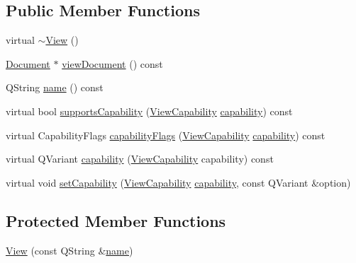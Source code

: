 \subsection*{Public Member Functions}
\begin{DoxyCompactItemize}
\item 
virtual \hyperlink{classOkular_1_1View_ad0dc854db9aabbea98a334dec89f785c}{$\sim$\+View} ()
\item 
\hyperlink{classOkular_1_1Document}{Document} $\ast$ \hyperlink{classOkular_1_1View_a0971e5296142cba87af2af289079efea}{view\+Document} () const 
\item 
Q\+String \hyperlink{classOkular_1_1View_aac1d4ae8bad44a4a845de118892cfa1e}{name} () const 
\item 
virtual bool \hyperlink{classOkular_1_1View_a65d4511363fe5a1fb836a26688bea50c}{supports\+Capability} (\hyperlink{classOkular_1_1View_ad95d365554715eb1eabb79350f51b294}{View\+Capability} \hyperlink{classOkular_1_1View_a32763d9566680b0ae37650a894245322}{capability}) const 
\item 
virtual Capability\+Flags \hyperlink{classOkular_1_1View_abad9d21eaeb248a4b6712aa5cd0ab6fc}{capability\+Flags} (\hyperlink{classOkular_1_1View_ad95d365554715eb1eabb79350f51b294}{View\+Capability} \hyperlink{classOkular_1_1View_a32763d9566680b0ae37650a894245322}{capability}) const 
\item 
virtual Q\+Variant \hyperlink{classOkular_1_1View_a32763d9566680b0ae37650a894245322}{capability} (\hyperlink{classOkular_1_1View_ad95d365554715eb1eabb79350f51b294}{View\+Capability} capability) const 
\item 
virtual void \hyperlink{classOkular_1_1View_a8a6fa965fa025331f2653c529a60eafe}{set\+Capability} (\hyperlink{classOkular_1_1View_ad95d365554715eb1eabb79350f51b294}{View\+Capability} \hyperlink{classOkular_1_1View_a32763d9566680b0ae37650a894245322}{capability}, const Q\+Variant \&option)
\end{DoxyCompactItemize}
\subsection*{Protected Member Functions}
\begin{DoxyCompactItemize}
\item 
\hyperlink{classOkular_1_1View_a5780edf1c77b41f495fa48383c9aa17d}{View} (const Q\+String \&\hyperlink{classOkular_1_1View_aac1d4ae8bad44a4a845de118892cfa1e}{name})
\end{DoxyCompactItemize}


